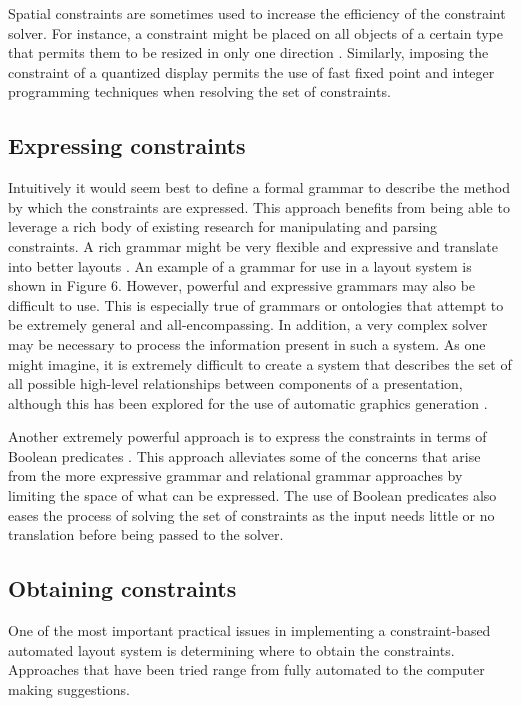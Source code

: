    Spatial constraints are sometimes used to increase the efficiency of the constraint solver. For instance, a constraint might be placed on all objects of a certain type that permits them to be resized in only one direction \citep{linton-1}. Similarly, imposing the constraint of a quantized display permits the use of fast fixed point and integer programming techniques when resolving the set of constraints.

    \subsection{Expressing constraints}

    Intuitively it would seem best to define a formal grammar to describe the method by which the constraints are expressed. This approach benefits from being able to leverage a rich body of existing research for manipulating and parsing constraints. A rich grammar might be very flexible and expressive and translate into better layouts \citep{weitzman-1}. An example of a grammar for use in a layout system is shown in Figure 6. However, powerful and expressive grammars may also be difficult to use. This is especially true of grammars or ontologies that attempt to be extremely general and all-encompassing. In addition, a very complex solver may be necessary to process the information present in such a system. As one might imagine, it is extremely difficult to create a system that describes the set of all possible high-level relationships between components of a presentation, although this has been explored for the use of automatic graphics generation \citep{zhou-1}.

    Another extremely powerful approach is to express the constraints in terms of Boolean predicates \citep{graf-1}. This approach alleviates some of the concerns that arise from the more expressive grammar and relational grammar approaches by limiting the space of what can be expressed. The use of Boolean predicates also eases the process of solving the set of constraints as the input needs little or no translation before being passed to the solver.

    \subsection{Obtaining constraints}

    One of the most important practical issues in implementing a constraint-based automated layout system is determining where to obtain the constraints. Approaches that have been tried range from fully automated to the computer making suggestions.

